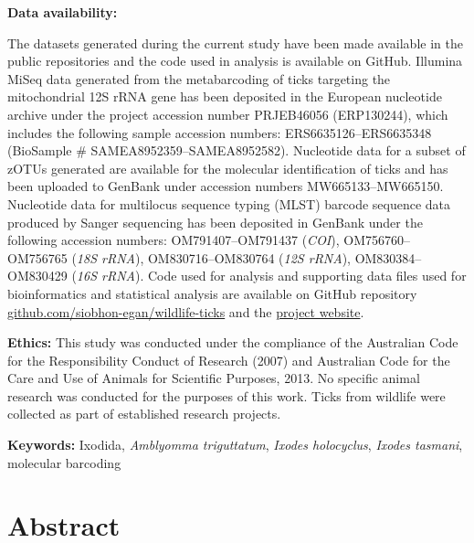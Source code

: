 \documentclass[a4paper, nobind]{templates/ociamthesis}
\begin{document}
\vspace{5mm}

\textbf{Data availability:}

The datasets generated during the current study have been made available in the public repositories and the code used in analysis is available on GitHub.
Illumina MiSeq data generated from the metabarcoding of ticks targeting the mitochondrial 12S rRNA gene has been deposited in the European nucleotide archive under the project accession number PRJEB46056 (ERP130244), which includes the following sample accession numbers: ERS6635126--ERS6635348 (BioSample \# SAMEA8952359--SAMEA8952582).
Nucleotide data for a subset of zOTUs generated are available for the molecular identification of ticks and has been uploaded to GenBank under accession numbers MW665133--MW665150.
Nucleotide data for multilocus sequence typing (MLST) barcode sequence data produced by Sanger sequencing has been deposited in GenBank under the following accession numbers: OM791407--OM791437 (\emph{COI}), OM756760--OM756765 (\emph{18S rRNA}), OM830716--OM830764 (\emph{12S rRNA}), OM830384--OM830429 (\emph{16S rRNA}).
Code used for analysis and supporting data files used for bioinformatics and statistical analysis are available on GitHub repository \href{https://github.com/siobhon-egan/wildlife-ticks}{github.com/siobhon-egan/wildlife-ticks} and the \href{https://siobhonlegan.com/wildlife-ticks/}{project website}.

\vspace{5mm}

\textbf{Ethics:}
This study was conducted under the compliance of the Australian Code for the Responsibility Conduct of Research (2007) and Australian Code for the Care and Use of Animals for Scientific Purposes, 2013.
No specific animal research was conducted for the purposes of this work. Ticks from wildlife were collected as part of established research projects.

\textbf{Keywords:} Ixodida, \emph{Amblyomma triguttatum}, \emph{Ixodes holocyclus}, \emph{Ixodes tasmani}, molecular barcoding

\newpage

\hypertarget{abstract}{%
\section{Abstract}\label{abstract}}
\end{document}
